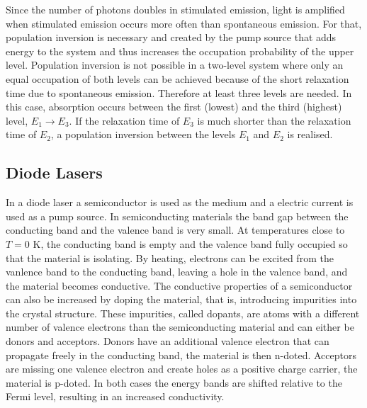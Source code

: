 Since the number of photons doubles in stimulated emission, light is amplified when 
stimulated emission occurs more often than spontaneous emission. For that, population inversion
is necessary and created by the pump source that adds energy to the 
system and thus increases the occupation probability of the upper level.                                                                                                                                                                                                                                                                                                                                                                                                                                                                                                                                                                                                         
Population inversion is not possible in a two-level system where only an equal occupation of 
both levels can be achieved because of the short relaxation time due to spontaneous emission.
Therefore at least three levels are needed. In this case, absorption occurs between the first (lowest)
and the third (highest) level, $E_1 \rightarrow E_3$. If the relaxation time of $E_3$ is 
much shorter than the relaxation time of $E_2$, a population inversion between the levels 
$E_1$ and $E_2$ is realised.

\subsection*{Diode Lasers}
In a diode laser a semiconductor is used as the medium and a electric current is used as a 
pump source. 
In semiconducting materials the band gap between the conducting band and the valence band is very small. %
At temperatures close to $T = 0 \text{ K}$, the conducting band is empty and the valence 
band fully occupied so that the material is isolating. 
By heating, electrons can be excited from the vanlence band to the conducting band, leaving
a hole in the valence band, and the material becomes conductive. 
The conductive properties of a semiconductor can also be increased by doping the material,
that is, introducing impurities into the crystal structure. These impurities, called dopants, are atoms with a 
different number of valence electrons than the semiconducting material and 
can either be donors and acceptors. 
Donors have an additional valence electron that can propagate freely in the conducting band,
the material is then n-doted. 
Acceptors are missing one valence electron and create holes as a positive charge carrier, the 
material is p-doted.
In both cases the energy bands are shifted relative to the Fermi level, resulting in an 
increased conductivity.

